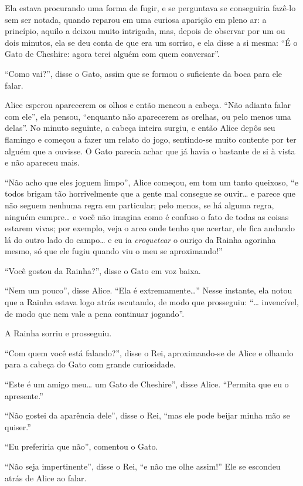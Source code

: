 Ela estava procurando uma forma de fugir, e se perguntava se conseguiria
fazê-lo sem ser notada, quando reparou em uma curiosa aparição em pleno
ar: a princípio, aquilo a deixou muito intrigada, mas, depois de
observar por um ou dois minutos, ela se deu conta de que era um sorriso,
e ela disse a si mesma: ``É o Gato de Cheshire: agora terei alguém com
quem conversar''.

``Como vai?'', disse o Gato, assim que se formou o suficiente da boca
para ele falar.

Alice esperou aparecerem os olhos e então meneou a cabeça. ``Não
adianta falar com ele'', ela pensou, ``enquanto não aparecerem as
orelhas, ou pelo menos uma delas''. No minuto seguinte, a cabeça inteira
surgiu, e então Alice depôs seu flamingo e começou a fazer um relato do
jogo, sentindo-se muito contente por ter alguém que a ouvisse. O Gato
parecia achar que já havia o bastante de si à vista e não apareceu mais.

``Não acho que eles joguem limpo'', Alice começou, em tom um tanto
queixoso, ``e todos brigam tão horrivelmente que a gente mal consegue se
ouvir\ldots{} e parece que não seguem nenhuma regra em particular; pelo
menos, se há alguma regra, ninguém cumpre\ldots{} e você não imagina como é
confuso o fato de todas as coisas estarem vivas; por exemplo, veja o arco
onde tenho que acertar, ele fica andando lá do outro lado do campo\ldots{} e
eu ia \textit{croquetear} o ouriço da Rainha agorinha mesmo, só que ele fugiu
quando viu o meu se aproximando!''

``Você gostou da Rainha?'', disse o Gato em voz baixa.

``Nem um pouco'', disse Alice. ``Ela é extremamente\ldots{}'' Nesse instante,
ela notou que a Rainha estava logo atrás escutando, de modo que
prosseguiu: ``\ldots{} invencível, de modo que nem vale a pena continuar
jogando''.

A Rainha sorriu e prosseguiu.

``Com quem você está falando?'', disse o Rei, aproximando-se de Alice e
olhando para a cabeça do Gato com grande curiosidade.

``Este é um amigo meu\ldots{} um Gato de Cheshire'', disse Alice. ``Permita
que eu o apresente.''

``Não gostei da aparência dele'', disse o Rei, ``mas ele pode beijar
minha mão se quiser.''

``Eu preferiria que não'', comentou o Gato.

``Não seja impertinente'', disse o Rei, ``e não me olhe assim!'' Ele se
escondeu atrás de Alice ao falar.

